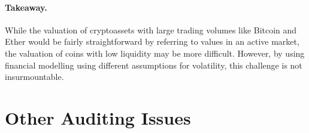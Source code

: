\paragraph{Takeaway.} While the valuation of cryptoassets with large trading volumes like Bitcoin and Ether would be fairly straightforward by referring to values in an active market, the valuation of coins with low liquidity may be more difficult. However, by using financial modelling using different assumptions for volatility, this challenge is not insurmountable.  

\section{Other Auditing Issues}


%
%

